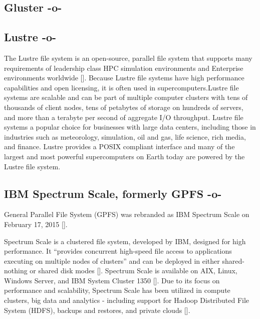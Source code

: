\subsection{Gluster -o-}



\subsection{Lustre -o-}

The Lustre file system is an open-source, parallel file system that
supports many requirements of leadership class HPC simulation
environments and Enterprise environments
worldwide [\cite{www-lustre}]. Because Lustre file systems have high
performance capabilities and open licensing, it is often used in
supercomputers.Lustre file systems are scalable and can be part of
multiple computer clusters with tens of thousands of client nodes,
tens of petabytes of storage on hundreds of servers, and more than a
terabyte per second of aggregate I/O throughput. Lustre file systems a
popular choice for businesses with large data centers, including those
in industries such as meteorology, simulation, oil and gas, life
science, rich media, and finance. Lustre provides a POSIX compliant
interface and many of the largest and most powerful supercomputers on
Earth today are powered by the Lustre file system.


     
\subsection{IBM Spectrum Scale, formerly GPFS -o-}

General Parallel File System (GPFS) was rebranded as IBM Spectrum
Scale on February 17, 2015 [\cite{www-wikigpfs}].

Spectrum Scale is a clustered file system, developed by IBM, designed
for high performance. It ``provides concurrent high-speed file access
to applications executing on multiple nodes of clusters'' and can be
deployed in either shared-nothing or shared disk
modes [\cite{www-wikigpfs}].  Spectrum Scale is available on AIX, Linux,
Windows Server, and IBM System Cluster 1350 [\cite{www-wikigpfs}].  Due
to its focus on performance and scalability, Spectrum Scale has been
utilized in compute clusters, big data and analytics - including
support for Hadoop Distributed File System (HDFS), backups and
restores, and private clouds [\cite{www-spectrumscale}].



